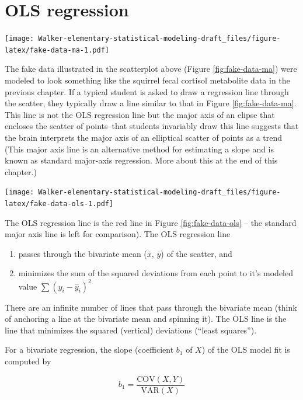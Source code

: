 \documentclass[]{book}
\providecommand{\tightlist}{%
  \setlength{\itemsep}{0pt}\setlength{\parskip}{0pt}}
\begin{document}
\section{OLS regression}\label{ols-regression}

\texttt{[image: Walker-elementary-statistical-modeling-draft\_files/figure-latex/fake-data-ma-1.pdf]}

The fake data illustrated in the scatterplot above (Figure
\ref{fig:fake-data-ma}) were modeled to look something like the squirrel
fecal cortisol metabolite data in the previous chapter. If a typical
student is asked to draw a regression line through the scatter, they
typically draw a line similar to that in Figure \ref{fig:fake-data-ma}.
This line is not the OLS regression line but the major axis of an elipse
that encloses the scatter of points--that students invariably draw this
line suggests that the brain interprets the major axis of an elliptical
scatter of points as a trend (This major axis line is an alternative
method for estimating a slope and is known as standard major-axis
regression. More about this at the end of this chapter.)

\texttt{[image: Walker-elementary-statistical-modeling-draft\_files/figure-latex/fake-data-ols-1.pdf]}

The OLS regression line is the red line in Figure
\ref{fig:fake-data-ols} -- the standard major axis line is left for
comparison). The OLS regression line

\begin{enumerate}
\def\labelenumi{\arabic{enumi}.}
\tightlist
\item
  passes through the bivariate mean (\(\bar{x}\), \(\bar{y}\)) of the
  scatter, and
\item
  minimizes the sum of the squared deviations from each point to it's
  modeled value \(\sum{(y_i - \hat{y}_i)^2}\)
\end{enumerate}

There are an infinite number of lines that pass through the bivariate
mean (think of anchoring a line at the bivariate mean and spinning it).
The OLS line is the line that minimizes the squared (vertical)
deviations (``least squares'').

For a bivariate regression, the slope (coefficient \(b_1\) of \(X\)) of
the OLS model fit is computed by

\begin{equation}
b_1 = \frac{\mathrm{COV}(X, Y)}{\mathrm{VAR}(X)}
\end{equation}
\end{document}
